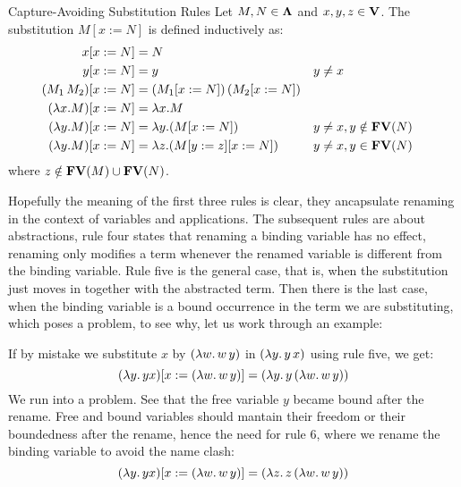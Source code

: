 \begin{definition}Capture-Avoiding Substitution Rules
  Let \( M, N \in \mathbf{\Lambda} \) and \( x, y, z \in \mathbf{V} \). The substitution \( M[x := N] \) is defined inductively as:
  \[
    \begin{aligned}
      x[x := N]                       & = N \\
      y[x := N]                       & = y && y \neq x \\
      (M_1\, M_2)[x := N]             & = (M_1[x := N])\,(M_2[x := N]) \\
      (\lambda x. M)[x := N]          & = \lambda x. M \\
      (\lambda y. M)[x := N]          & = \lambda y. (M[x := N]) && y \neq x, y \notin \mathbf{FV}( N ) \\
      (\lambda y. M)[x := N]          & = \lambda z. (M[y := z][x := N]) && y \neq x, y \in \mathbf{FV}( N )
    \end{aligned}
  \]
  where \( z \notin \mathbf{FV}( M ) \cup \mathbf{FV}( N ) \).
\end{definition}
Hopefully the meaning of the first three rules is clear, they ancapsulate renaming in the context of variables and applications. The subsequent rules are about abstractions, rule four states that renaming a binding variable has no effect, renaming only modifies a term whenever the renamed variable is different from the binding variable. Rule five is the general case, that is, when the substitution just moves in together with the abstracted term. Then there is the last case, when the binding variable is a bound occurrence in the term we are substituting, which poses a problem, to see why, let us work through an example:
\begin{example} If by mistake we substitute $x$ by \( (\lambda w . \, w \, y) \) in \( (\lambda y . \, y \, x ) \) using rule five, we get:
  \[
    (\lambda y . \, y x) [x := (\lambda w . \, w \, y)] = (\lambda y . \, y \, (\lambda w. \, w \, y))
  \]
  We run into a problem. See that the free variable $y$ became bound after the rename. Free and bound variables should mantain their freedom or their boundedness after the rename, hence the need for rule 6, where we rename the binding variable to avoid the name clash:
  \[
    (\lambda y . \, y x) [x := (\lambda w . \, w \, y)] = (\lambda z . \, z \, (\lambda w. \, w \, y))
  \]
  
\end{example}
